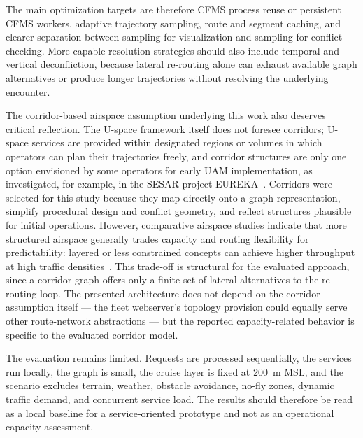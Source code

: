 The main optimization targets are therefore CFMS process reuse or persistent CFMS workers, adaptive trajectory sampling, route and segment caching, and clearer separation between sampling for visualization and sampling for conflict checking. More capable resolution strategies should also include temporal and vertical deconfliction, because lateral re-routing alone can exhaust available graph alternatives or produce longer trajectories without resolving the underlying encounter.

The corridor-based airspace assumption underlying this work also deserves critical reflection. The U-space framework itself does not foresee corridors; U-space services are provided within designated regions or volumes in which operators can plan their trajectories freely, and corridor structures are only one option envisioned by some operators for early UAM implementation, as investigated, for example, in the SESAR project EUREKA~\cite{sesar_eureka_project}. Corridors were selected for this study because they map directly onto a graph representation, simplify procedural design and conflict geometry, and reflect structures plausible for initial operations. However, comparative airspace studies indicate that more structured airspace generally trades capacity and routing flexibility for predictability: layered or less constrained concepts can achieve higher throughput at high traffic densities~\cite{sunil2015metropolis,schneider2014metropolis,abdellaoui2025_airspace_uam,schuchardt2023_atm_uam_review}. This trade-off is structural for the evaluated approach, since a corridor graph offers only a finite set of lateral alternatives to the re-routing loop. The presented architecture does not depend on the corridor assumption itself --- the fleet webserver's topology provision could equally serve other route-network abstractions --- but the reported capacity-related behavior is specific to the evaluated corridor model.

The evaluation remains limited. Requests are processed sequentially, the services run locally, the graph is small, the cruise layer is fixed at \SI{200}{m} MSL, and the scenario excludes terrain, weather, obstacle avoidance, no-fly zones, dynamic traffic demand, and concurrent service load. The results should therefore be read as a local baseline for a service-oriented prototype and not as an operational capacity assessment.
